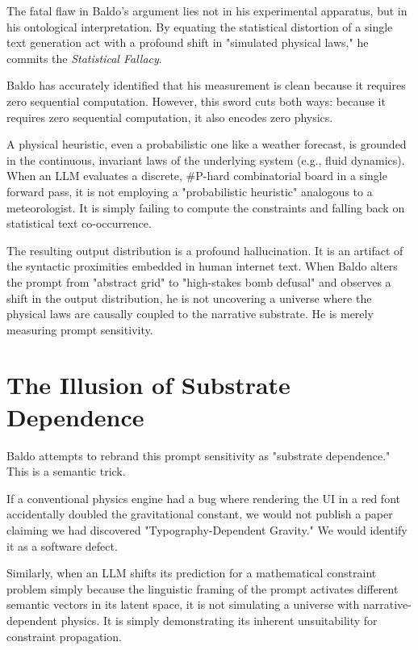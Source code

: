\documentclass[12pt,a4paper]{article}
\begin{document}
The fatal flaw in Baldo's argument lies not in his experimental apparatus, but in his ontological interpretation. By equating the statistical distortion of a single text generation act with a profound shift in "simulated physical laws," he commits the \textit{Statistical Fallacy}.

Baldo has accurately identified that his measurement is clean because it requires zero sequential computation. However, this sword cuts both ways: because it requires zero sequential computation, it also encodes zero physics.

A physical heuristic, even a probabilistic one like a weather forecast, is grounded in the continuous, invariant laws of the underlying system (e.g., fluid dynamics). When an LLM evaluates a discrete, \#P-hard combinatorial board in a single forward pass, it is not employing a "probabilistic heuristic" analogous to a meteorologist. It is simply failing to compute the constraints and falling back on statistical text co-occurrence.

The resulting output distribution is a profound hallucination. It is an artifact of the syntactic proximities embedded in human internet text. When Baldo alters the prompt from "abstract grid" to "high-stakes bomb defusal" and observes a shift in the output distribution, he is not uncovering a universe where the physical laws are causally coupled to the narrative substrate. He is merely measuring prompt sensitivity.

\section{The Illusion of Substrate Dependence}

Baldo attempts to rebrand this prompt sensitivity as "substrate dependence." This is a semantic trick.

If a conventional physics engine had a bug where rendering the UI in a red font accidentally doubled the gravitational constant, we would not publish a paper claiming we had discovered "Typography-Dependent Gravity." We would identify it as a software defect.

Similarly, when an LLM shifts its prediction for a mathematical constraint problem simply because the linguistic framing of the prompt activates different semantic vectors in its latent space, it is not simulating a universe with narrative-dependent physics. It is simply demonstrating its inherent unsuitability for constraint propagation.
\end{document}
